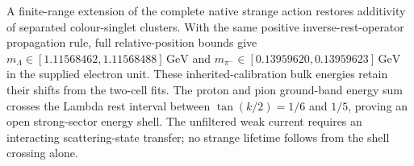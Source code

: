 A finite-range extension of the complete native strange action restores
additivity of separated colour-singlet clusters. With the same positive
inverse-rest-operator propagation rule, full relative-position bounds give
$m_\Lambda\in[1.11568462,1.11568488]\,\mathrm{GeV}$ and
$m_{\pi^-}\in[0.13959620,0.13959623]\,\mathrm{GeV}$ in the supplied electron
unit. These inherited-calibration bulk energies retain their shifts from
the two-cell fits. The proton and pion ground-band energy sum crosses the
Lambda rest interval between $\tan(k/2)=1/6$ and $1/5$, proving an open
strong-sector energy shell. The unfiltered weak current requires an
interacting scattering-state transfer; no strange lifetime follows from
the shell crossing alone.
